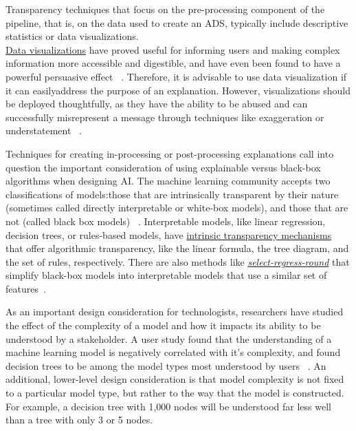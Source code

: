 \documentclass[sigconf, nonacm]{acmart}
\begin{document}
Transparency techniques that focus on the pre-processing component of the pipeline, that is, on the data used to create an ADS, typically include descriptive statistics or data visualizations.\\
\underline{Data visualizations} have proved useful for informing users and making complex information more accessible and digestible, and have even been found to have a powerful persuasive effect ~\cite{DBLP:journals/tvcg/PandeyMNSB14, tal2016blinded}. Therefore, it is advisable to use data visualization if it can easilyaddress the purpose of an explanation. However, visualizations should be deployed thoughtfully, as they have the ability to be abused and can successfully misrepresent a message through techniques like exaggeration or understatement ~\cite{pandey2015deceptive}.

Techniques for creating in-processing or post-processing explanations call into question the important consideration of using explainable versus black-box algorithms when designing AI. The machine learning community accepts two classifications of models:those that are intrinsically transparent by their nature (sometimes called directly interpretable or white-box models), and those that are not (called black box models) ~\cite{DBLP:journals/corr/abs-2012-01805}. Interpretable models, like linear regression, decision trees, or rules-based models, have \underline{intrinsic transparency mechanisms} that offer algorithmic transparency, like the linear formula, the tree diagram, and the set of rules, respectively. There are also methods like \underline{\emph{select-regress-round}} that simplify black-box models into interpretable models that use a similar set of features~\cite{jung2017simple}.

As an important design consideration for technologists, researchers have studied the effect of the complexity of a model and how it impacts its ability to be understood by a stakeholder. A user study found that the understanding of a machine learning model is negatively correlated with it's complexity, and found decision trees to be among the model types most understood by users ~\cite{DBLP:conf/scai/AllahyariL11}. An additional, lower-level design consideration is that model complexity is not fixed to a particular model type, but rather to the way that the model is constructed. For example, a decision tree with 1,000 nodes will be understood far less well than a tree with only 3 or 5 nodes.
\end{document}
